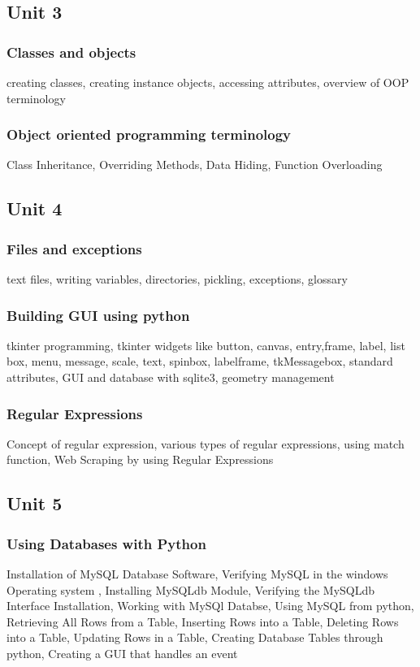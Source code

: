 \documentclass[twocolumn]{article}
\begin{document}
    \subsection*{Unit 3}
    \subsubsection*{Classes and objects}
    creating classes, creating instance objects, accessing attributes, overview of OOP terminology    
    \subsubsection*{Object oriented programming terminology}
    Class Inheritance, Overriding Methods, Data Hiding, Function Overloading
    \subsection*{Unit 4}
    \subsubsection*{Files and exceptions}
    text files, writing variables, directories, pickling, exceptions, glossary
    \subsubsection*{Building GUI using python}
    tkinter programming, tkinter widgets like button, canvas, entry,frame, label, list box, menu, message, scale, text, spinbox, labelframe, tkMessagebox, standard attributes, GUI and database with sqlite3, geometry management
    \subsubsection*{Regular Expressions}
    Concept of regular expression, various types of regular expressions, using match function, Web Scraping by using Regular Expressions
    \subsection*{Unit 5}
    \subsubsection*{Using Databases with Python}
    Installation of MySQL Database Software, Verifying MySQL in the windows Operating system , Installing MySQLdb Module, Verifying the MySQLdb Interface Installation, Working with MySQl Databse, Using MySQL from python, Retrieving All Rows from a Table, Inserting Rows into a Table, Deleting Rows into a Table, Updating Rows in a Table, Creating Database Tables through python, Creating a GUI that handles an event
\end{document}
